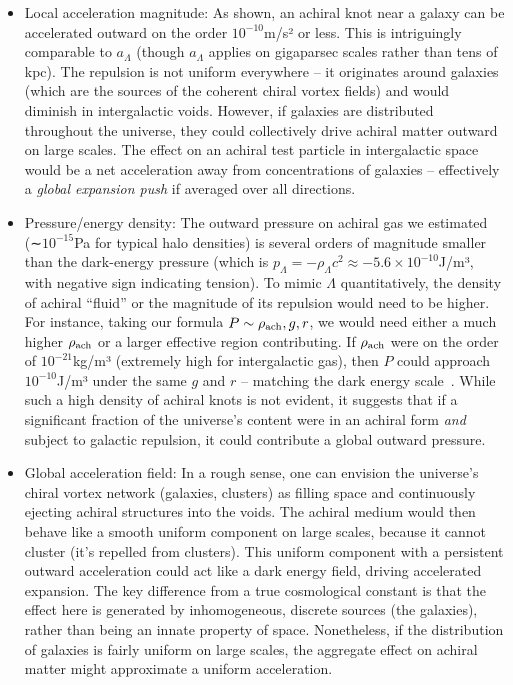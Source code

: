 \begin{itemize}

\item
Local acceleration magnitude: As shown, an achiral knot near a galaxy can be accelerated outward on the order $10^{-10}$m/s² or less. This is intriguingly comparable to $a_\Lambda$ (though $a_\Lambda$ applies on gigaparsec scales rather than tens of kpc). The repulsion is not uniform everywhere – it originates around galaxies (which are the sources of the coherent chiral vortex fields) and would diminish in intergalactic voids. However, if galaxies are distributed throughout the universe, they could collectively drive achiral matter outward on large scales. The effect on an achiral test particle in intergalactic space would be a net acceleration away from concentrations of galaxies – effectively a \textit{global expansion push} if averaged over all directions.




\item
Pressure/energy density: The outward pressure on achiral gas we estimated (∼$10^{-15}$Pa for typical halo densities) is several orders of magnitude smaller than the dark-energy pressure (which is $p_\Lambda = -\rho_\Lambda c^2 \approx -5.6\times10^{-10}$J/m³, with negative sign indicating tension). To mimic $\Lambda$ quantitatively, the density of achiral “fluid” or the magnitude of its repulsion would need to be higher. For instance, taking our formula $P \sim \rho_{\rm ach},g,r$, we would need either a much higher $\rho_{\rm ach}$ or a larger effective region contributing. If $\rho_{\rm ach}$ were on the order of $10^{-21}$kg/m³ (extremely high for intergalactic gas), then $P$ could approach $10^{-10}$J/m³ under the same $g$ and $r$ – matching the dark energy scale~\cite{knot_theroy_in_fluid}. While such a high density of achiral knots is not evident, it suggests that if a significant fraction of the universe’s content were in an achiral form \textit{and} subject to galactic repulsion, it could contribute a global outward pressure.




\item
Global acceleration field: In a rough sense, one can envision the universe’s chiral vortex network (galaxies, clusters) as filling space and continuously ejecting achiral structures into the voids. The achiral medium would then behave like a smooth uniform component on large scales, because it cannot cluster (it’s repelled from clusters). This uniform component with a persistent outward acceleration could act like a dark energy field, driving accelerated expansion. The key difference from a true cosmological constant is that the effect here is generated by inhomogeneous, discrete sources (the galaxies), rather than being an innate property of space. Nonetheless, if the distribution of galaxies is fairly uniform on large scales, the aggregate effect on achiral matter might approximate a uniform acceleration.




\end{itemize}

